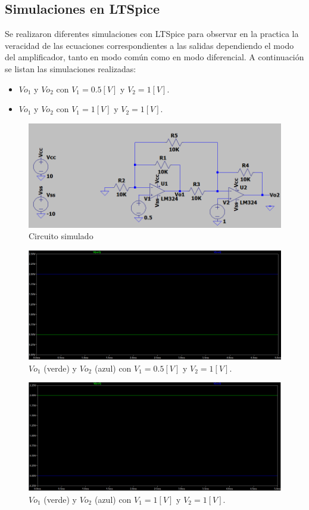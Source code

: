 \documentclass[11pt, a4paper]{article}
\begin{document}
\subsection{Simulaciones en LTSpice}
Se realizaron diferentes simulaciones con LTSpice para observar en la practica la veracidad de las ecuaciones correspondientes a las salidas dependiendo el modo del amplificador, tanto en modo común como en modo diferencial. A continuación se listan las simulaciones realizadas:
\begin{itemize}
	\item $Vo_1$ y $Vo_2$ con $V_1=0.5[V]$ y $V_2=1[V]$.
	\item $Vo_1$ y $Vo_2$ con $V_1=1[V]$ y $V_2=1[V]$.
\end{itemize}
\begin{figure}[H]
	\centering
	\includegraphics[width=1\textwidth]{Imagenes/Circuito1_1.png}
	\caption{Circuito simulado}
\end{figure}
\begin{figure}[H]
	\centering
	\includegraphics[width=1\textwidth]{Imagenes/Sim1.png}
	\caption{$Vo_1$ (verde) y $Vo_2$ (azul) con $V_1=0.5[V]$ y $V_2=1[V]$.}
\end{figure}
\begin{figure}[H]
	\centering
	\includegraphics[width=1\textwidth]{Imagenes/Sim2.png}
	\caption{$Vo_1$ (verde) y $Vo_2$ (azul) con $V_1=1[V]$ y $V_2=1[V]$.}
\end{figure}
\end{document}
